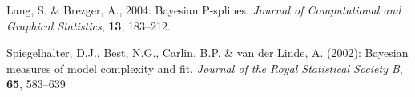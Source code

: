 \documentclass[a4paper]{article}
\begin{document}
\begin{thebibliography}{99}
 Lang, S. \& Brezger,
A., 2004: Bayesian P-splines. {\it Journal of Computational and
Graphical Statistics}, {\bf 13}, 183--212.

 Spiegelhalter,
D.J., Best, N.G., Carlin, B.P. \& van der Linde, A. (2002):
Bayesian measures of model complexity and fit. {\it Journal of the
Royal Statistical Society B}, {\bf 65}, 583--639

\end{thebibliography}
\end{document}
